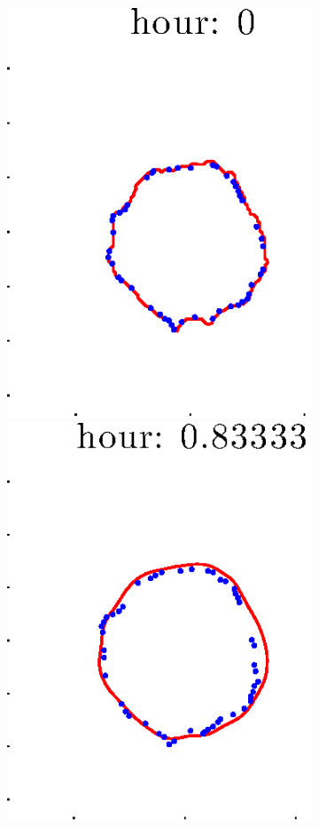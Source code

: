 \documentclass[12pt]{article}
\begin{document}
\begin{figure}[h!]
\begin{subfigure}[b]{.3\textwidth}
	\end{subfigure}
	\begin{subfigure}[b]{.3\textwidth}
	\centering
		\includegraphics[height=.15\textheight]{Pos14exp8/secondhalf/second1.eps}
		\includegraphics[height=.15\textheight]{Pos14exp8/secondhalf/second2.eps}

\end{subfigure}
\end{figure}
\end{document}
